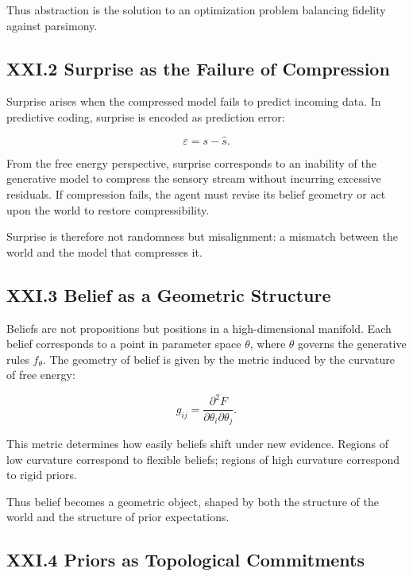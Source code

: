 \documentclass[12pt,letterpaper]{article}
\begin{document}
Thus abstraction is the solution to an optimization problem balancing fidelity against parsimony.

\subsection{XXI.2 Surprise as the Failure of Compression}

Surprise arises when the compressed model fails to predict incoming data. In predictive coding, surprise is encoded as prediction error:

\[
\varepsilon = s - \hat{s}.
\]

From the free energy perspective, surprise corresponds to an inability of the generative model to compress the sensory stream without incurring excessive residuals. If compression fails, the agent must revise its belief geometry or act upon the world to restore compressibility.

Surprise is therefore not randomness but misalignment: a mismatch between the world and the model that compresses it.

\subsection{XXI.3 Belief as a Geometric Structure}

Beliefs are not propositions but positions in a high-dimensional manifold. Each belief corresponds to a point in parameter space \(\theta\), where \(\theta\) governs the generative rules \(f_\theta\). The geometry of belief is given by the metric induced by the curvature of free energy:

\[
g_{ij} = \frac{\partial^2 F}{\partial \theta_i \partial \theta_j}.
\]

This metric determines how easily beliefs shift under new evidence. Regions of low curvature correspond to flexible beliefs; regions of high curvature correspond to rigid priors.

Thus belief becomes a geometric object, shaped by both the structure of the world and the structure of prior expectations.

\subsection{XXI.4 Priors as Topological Commitments}
\end{document}
